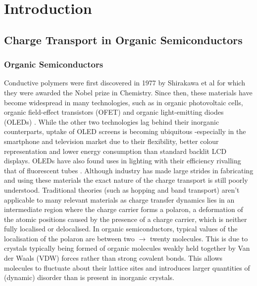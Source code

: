\chapter{Introduction}
\label{chap:intro}

\section{Charge Transport in Organic Semiconductors}
\subsection{Organic Semiconductors}
Conductive polymers were first discovered in 1977 by Shirakawa et al  \cite{chiang_electrical_1977, Shirakawa1977Jan} for which they were awarded the Nobel prize in Chemistry. Since then, these materials have become widespread in many technologies, such as in organic photovoltaic cells\cite{Kippelen2009}, organic field-effect transistors (OFET) \cite{Malachowski2010Jun} and organic light-emitting diodes (OLEDs) \cite{ThejoKalyani2012Jun}. While the other two technologies lag behind their inorganic counterparts, uptake of OLED screens is becoming ubiquitous -especially in the smartphone and television market due to their flexibility, better colour representation and lower energy consumption than standard backlit LCD displays. OLEDs have also found uses in lighting with their efficiency rivalling that of fluorescent tubes \cite{Reineke2009May, OLED_lighting}. Although industry has made large strides in fabricating and using these materials the exact nature of the charge transport is still poorly understood. Traditional theories (such as hopping and band transport) aren't applicable to many relevant materials \cite{coropceanu_charge_2007, Giannini2019, C0CS00198H, Fratini_2016, yavuz_dichotomy_2017} as charge transfer dynamics lies in an intermediate region where the charge carrier forms a polaron, a deformation of the atomic positions caused by the presence of a charge carrier, which is neither fully localised or delocalised. In organic semiconductors, typical values of the localisation of the polaron are between two $\rightarrow$ twenty molecules. This is due to crystals typically being formed of organic molecules weakly held together by Van der Waals (VDW) forces rather than strong covalent bonds. This allows molecules to fluctuate about their lattice sites and introduces larger quantities of (dynamic) disorder than is present in inorganic crystals. 
\\\\

